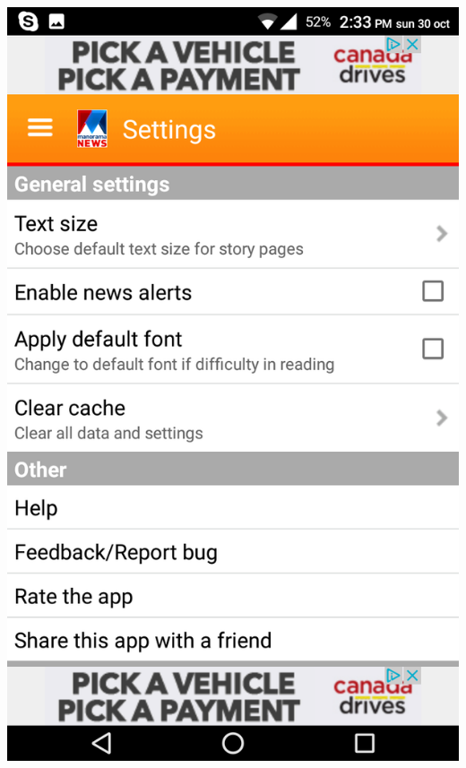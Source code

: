 \documentclass[a4paper, 11pt]{article}
\begin{document}
\includegraphics[scale=0.15]{se.png}
\end{document}
